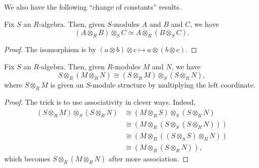 We also have the following ``change of constants'' results.
\begin{proposition}
	Fix $S$ an $R$-algebra. Then, given $S$-modules $A$ and $B$ and $C$, we have
	\[(A\otimes_RB)\otimes_SC\simeq A\otimes_R(B\otimes_SC).\]
\end{proposition}
\begin{proof}
	The isomorphism is by $(a\otimes b)\otimes c\mapsto a\otimes(b\otimes c)$.
\end{proof}
\begin{proposition}
	Fix $S$ an $R$-algebra. Then, given $R$-modules $M$ and $N$, we have
	\[S\otimes_R(M\otimes_RN)\cong(S\otimes_RM)\otimes_S(S\otimes_RN),\]
	where $S\otimes_RM$ is given an $S$-module structure by multiplying the left coordinate.
\end{proposition}
\begin{proof}
	The trick is to use associativity in clever ways. Indeed,
	\begin{align*}
		(S\otimes_RM)\otimes_S(S\otimes_RN) &\cong (M\otimes_RS)\otimes_S
		(S\otimes_RN) \\
		&\cong (M\otimes_R(S\otimes_S(S\otimes_RN))) \\
		&\cong (M\otimes_R((S\otimes_SS)\otimes_RN)) \\
		&\cong (M\otimes_R(S\otimes_RN)),
	\end{align*}
	which becomes $S\otimes_R(M\otimes_RN)$ after more association.
\end{proof}

